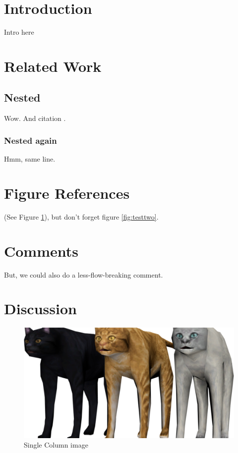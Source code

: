 \documentclass[sigconf, screen, review]{acmart}
\begin{document}

\maketitle

\section{Introduction}
\par Intro here

\section{Related Work}
\subsection{Nested}
\par Wow. And citation \cite{knuth1990}.
\subsubsection{Nested again}
\par Hmm, same line.

\section{Figure References}
\par (See Figure \ref{fig:testone}), but don't forget figure \ref{fig:testtwo}.

\section{Comments}
\par But, we could also do a  less-flow-breaking comment.

\section{Discussion}
\begin{figure}[!htbp]
	\centering
	\includegraphics[width=0.85\linewidth]{images/example.png}
	\caption{Single Column image}
	\label{fig:testone}
\end{figure}
\end{document}
